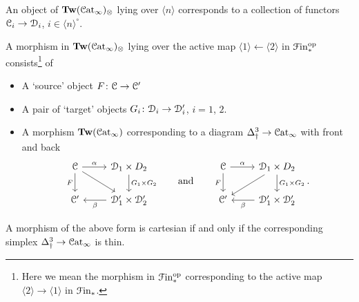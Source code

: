 \documentclass[main.tex]{subfiles}
\begin{document}
\begin{example}
  An object of $\mathbf{Tw}(\mathcal{C}\mathrm{at}_{\infty})_{\otimes}$ lying over $\langle n \rangle$ corresponds to a collection of functors $\mathcal{C}_{i} \to \mathcal{D}_{i}$, $i \in \langle n \rangle^{\circ}$.
\end{example}

\begin{example}
  A morphism in $\mathbf{Tw}(\mathcal{C}\mathrm{at}_{\infty})_{\otimes}$ lying over the active map $\langle 1 \rangle \leftarrow \langle 2 \rangle$ in $\mathcal{F}\mathrm{in}_{*}^{\mathrm{op}}$ consists\footnote{Here we mean the morphism in $\mathcal{F}\mathrm{in}_{*}^{\mathrm{op}}$ corresponding to the active map $\langle 2 \rangle \to \langle 1 \rangle$ in $\mathcal{F}\mathrm{in}_{*}$.} of
  \begin{itemize}
    \item A `source' object $F\colon \mathcal{C} \to \mathcal{C}'$

    \item A pair of `target' objects $G_{i}\colon \mathcal{D}_{i} \to \mathcal{D}'_{i}$, $i = 1$, $2$.

    \item A morphism $\mathbf{Tw}(\mathcal{C}\mathrm{at}_{\infty})$ corresponding to a diagram $\Delta^{3}_{\dagger} \to \mathcal{C}\mathrm{at}_{\infty}$ with front and back
      \begin{equation*}
        \begin{tikzcd}
          \category{C}
          \arrow[r, "\alpha"]
          \arrow[d, ""{name=L, right}, "F"{left}]
          \arrow[dr]
          & \category{D}_{1} \times D_{2}
          \arrow[d, ""{name=R, left}, "G_{1} \times G_{2}"{right}]
          \\
          \category{C}'
          & \category{D}'_{1} \times \category{D}'_{2}
          \arrow[l, "\beta"]
        \end{tikzcd}
        \qquad\text{and}\qquad
        \begin{tikzcd}
          \category{C}
          \arrow[r, "\alpha"]
          \arrow[d, ""{name=L, right}, "F"{left}]
          & \category{D}_{1} \times D_{2}
          \arrow[d, ""{name=R, left}, "G_{1} \times G_{2}"{right}]
          \arrow[dl]
          \\
          \category{C}'
          & \category{D}'_{1} \times \category{D}'_{2}
          \arrow[l, "\beta"]
        \end{tikzcd}.
      \end{equation*}
  \end{itemize}

  A morphism of the above form is cartesian if and only if the corresponding simplex $\Delta^{3}_{\dagger} \to \mathcal{C}\mathrm{at}_{\infty}$ is thin.
\end{example}
\end{document}
